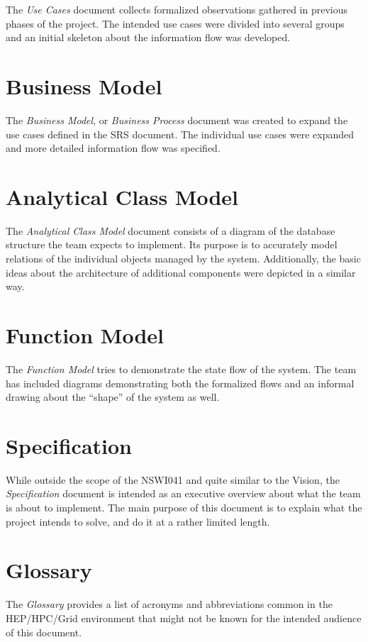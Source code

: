 \documentclass[12pt]{article}
\begin{document}
The {\em Use Cases} document collects formalized observations gathered in previous phases of the project.  The intended use cases
were divided into several groups and an initial skeleton about the information flow was developed.

\section{Business Model}

The {\em Business Model}, or {\em Business Process} document was created to expand the use cases defined in the SRS document.  The
individual use cases were expanded and more detailed information flow was specified.

\section{Analytical Class Model}

The {\em Analytical Class Model} document consists of a diagram of the database structure the team expects to implement.  Its
purpose is to accurately model relations of the individual objects managed by the system.  Additionally, the basic ideas about the
architecture of additional components were depicted in a similar way.

\section{Function Model}

The {\em Function Model} tries to demonstrate the state flow of the system.  The team has included diagrams demonstrating both the
formalized flows and an informal drawing about the ``shape'' of the system as well.

\section{Specification}

While outside the scope of the NSWI041 and quite similar to the Vision, the {\em Specification} document is intended as an
executive overview about what the team is about to implement.  The main purpose of this document is to explain what the project
intends to solve, and do it at a rather limited length.

\section{Glossary}

The {\em Glossary} provides a list of acronyms and abbreviations common in the HEP/HPC/Grid environment that might not be known
for the intended audience of this document.
\end{document}
